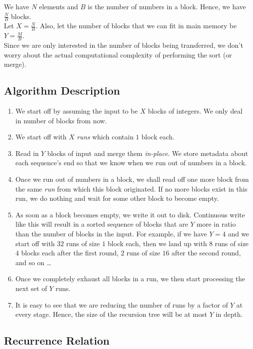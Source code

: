 \documentclass{article}
\begin{document}
We have $N$ elements and $B$ is the number of numbers in a
block. Hence, we have $\frac{N}{B}$ blocks.\\ Let $X =
\frac{N}{B}$. Also, let the number of blocks that we can fit in main
memory be $Y = \frac{M}{B}$.
\\
Since we are only interested in the number of blocks being
transferred, we don't worry about the actual computational complexity
of performing the sort (or merge).\\

\subsection{Algorithm Description}

\begin{enumerate}
\item We start off by assuming the input to be $X$ blocks of
  integers. We only deal in number of blocks from now.
\item We start off with $X$ \textit{runs} which contain $1$ block
  each.
\item Read in $Y$ blocks of input and merge them
  \textit{in-place}. We store metadata about each sequence's end so
  that we know when we run out of numbers in a block.
\item Once we run out of numbers in a block, we shall read off one more
  block from the same \textit{run} from which this block
  originated. If no more blocks exist in this run, we do nothing and
  wait for some other block to become empty.
\item As soon as a block becomes empty, we write it out to
  disk. Continuous write like this will result in a sorted sequence of
  blocks that are $Y$ more in ratio than the number of blocks in the
  input. For example, if we have $Y = 4$ and we start off with $32$
  runs of size $1$ block each, then we land up with $8$ runs of size
  $4$ blocks each after the first round, $2$ runs of size $16$ after
  the second round, and so on \ldots{}
\item Once we completely exhaust all blocks in a run, we then start
  processing the next set of $Y$ runs.
\item It is easy to see that we are reducing the number of runs by a
  factor of $Y$ at every stage. Hence, the size of the recursion tree
  will be at most $Y$ in depth.
\end{enumerate}

\subsection{Recurrence Relation}
\end{document}
